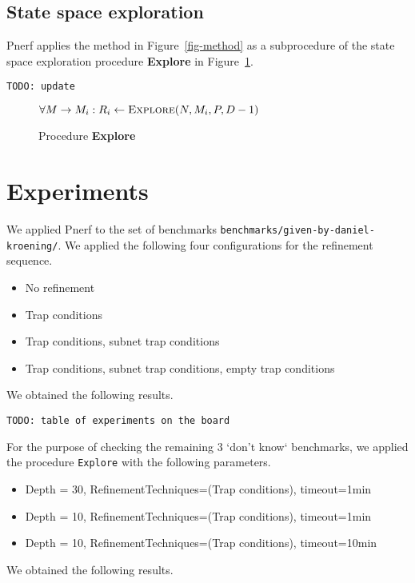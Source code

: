 \documentclass{article}
\begin{document}
\subsection{State space exploration}

Pnerf applies the method in Figure~\ref{fig-method} as a subprocedure of
the state space exploration procedure {\bf Explore} in
Figure~\ref{fig-procedure-explore}.

\verb?TODO: update?

\begin{figure}
\begin{algorithmic}[1]
    \State \Return {}
    \State \Return {}
    \State \Return {}
  \Else
    \State $\forall M \rightarrow M_i: R_i \gets \Call{Explore}{N, M_i, P, D-1}$
      \State \Return {}
      \State \Return {}
    \Else {}
      \State \Return {}
    \EndIf
  \EndIf
\EndFunction
\end{algorithmic}
\caption{Procedure {\bf Explore}}
\label{fig-procedure-explore}
\end{figure}


\section{Experiments}

We applied Pnerf to the set of benchmarks
\verb?benchmarks/given-by-daniel-kroening/?. We applied the following
four configurations for the refinement sequence.
\begin{itemize}
\item No refinement
\item Trap conditions
\item Trap conditions, subnet trap conditions
\item Trap conditions, subnet trap conditions, empty trap conditions
\end{itemize}
We obtained the following results.

\verb?TODO: table of experiments on the board?

For the purpose of checking the remaining 3 `don't know` benchmarks,
we applied the procedure \verb?Explore? with the following parameters.
\begin{itemize}
\item Depth = 30, RefinementTechniques=(Trap conditions), timeout=1min
\item Depth = 10, RefinementTechniques=(Trap conditions), timeout=1min
\item Depth = 10, RefinementTechniques=(Trap conditions), timeout=10min
\end{itemize}
We obtained the following results.
\end{document}
